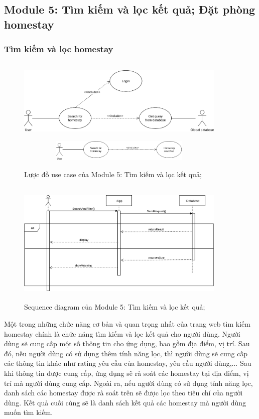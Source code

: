 \newpage
\subsection{Module 5: Tìm kiếm và lọc kết quả; Đặt phòng homestay}

\subsubsection{ Tìm kiếm và lọc homestay}
\begin{figure}[!h]
	\centering
	\includegraphics[width = 10cm, height = 4cm]{parts/Khoa/khoa_ui/search.png}
	\includegraphics[width = 10cm, height = 1cm]{parts/Khoa/khoa_ui/filter.png}
	\caption{Lược đồ use case của Module 5: Tìm kiếm và lọc kết quả;}
\end{figure}
\begin{figure}[!h]
	\centering
	\includegraphics[width = 10cm, height = 6cm]{parts/Khoa/khoa_ui/khoa_search_and_filter.png}
	\caption{Sequence diagram của Module 5: Tìm kiếm và lọc kết quả;}
\end{figure}
Một trong những chức năng cơ bản và quan trọng nhất của trang web tìm kiếm homestay chính là chức năng tìm kiếm và lọc kết quả cho người dùng. Người dùng sẽ cung cấp một số thông tin cho ứng dụng, bao gồm địa điểm, vị trí. Sau đó, nếu người dùng có sử dụng thêm tính năng lọc, thì người dùng sẽ cung cấp các thông tin khác như rating yêu cầu của homestay, yêu cầu người dùng,... Sau khi thông tin được cung cấp, ứng dụng sẽ rà soát các homestay tại địa điểm, vị trí mà người dùng cung cấp. Ngoài ra, nếu người dùng có sử dụng tính năng lọc, danh sách các homestay được rà soát trên sẽ được lọc theo tiêu chí của người dùng. Kết quả cuối cùng sẽ là danh sách kết quả các homestay mà người dùng muốn tìm kiếm.
